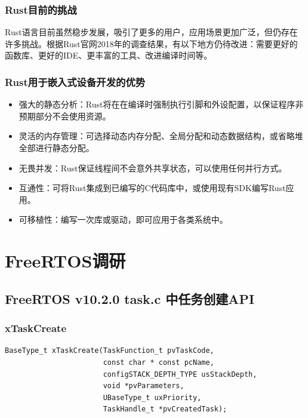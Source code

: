 \documentclass[12pt, a4paper]{article}
\begin{document}
	\subsubsection{Rust目前的挑战}
	Rust语言目前虽然稳步发展，吸引了更多的用户，应用场景更加广泛，但仍存在许多挑战。根据Rust官网2018年的调查结果，有以下地方仍待改进：需要更好的函数库、更好的IDE、更丰富的工具、改进编译时间等。   
	
	\subsubsection{Rust用于嵌入式设备开发的优势}
	\begin{itemize}
		\item 强大的静态分析：Rust将在在编译时强制执行引脚和外设配置，以保证程序非预期部分不会使用资源。   
		\item 灵活的内存管理：可选择动态内存分配、全局分配和动态数据结构，或省略堆全部进行静态分配。
		\item 无畏并发：Rust保证线程间不会意外共享状态，可以使用任何并行方式。   
		\item 互通性：可将Rust集成到已编写的C代码库中，或使用现有SDK编写Rust应用。
		\item 可移植性：编写一次库或驱动，即可应用于各类系统中。
	\end{itemize}
	
	\section{FreeRTOS调研}
	\subsection{FreeRTOS v10.2.0 task.c 中任务创建API}
\subsubsection {xTaskCreate}

\begin{lstlisting}[language={[ANSI]C},keywordstyle=\color{blue!70},commentstyle=\color{red!50!green!50!blue!50},frame=shadowbox, rulesepcolor=\color{red!20!green!20!blue!20}]
BaseType_t xTaskCreate(TaskFunction_t pvTaskCode,
                       const char * const pcName,
                       configSTACK_DEPTH_TYPE usStackDepth,
                       void *pvParameters,
                       UBaseType_t uxPriority,
                       TaskHandle_t *pvCreatedTask);
\end{lstlisting}
\end{document}
